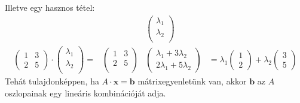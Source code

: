 \documentclass[a4paper,12pt,twoside]{book}
\newcommand{\vek}[1]{\mathbf{#1}} %
\theoremstyle{break}
\begin{document}
Illetve egy hasznos tétel:
\[\begin{matrix}
   & & \begin{pmatrix}
      \lambda_1 \\
      \lambda_2 \\
     \end{pmatrix} & \\

   \begin{pmatrix}
    1 & 3 \\
    2 & 5
   \end{pmatrix}\cdot \begin{pmatrix}
      \lambda_1 \\
      \lambda_2 \\
     \end{pmatrix} = 
   &
   \begin{pmatrix}
    1 & 3 \\
    2 & 5 \\
   \end{pmatrix}
   &
   \begin{pmatrix}
      \lambda_1 + 3\lambda_2\\
      2\lambda_1 + 5\lambda_2
     \end{pmatrix}
   & = \lambda_1\begin{pmatrix}1\\ 2\end{pmatrix} + \lambda_2\begin{pmatrix}3\\ 5\end{pmatrix}
  \end{matrix}
\]
Tehát tulajdonképpen, ha $A\cdot \vek{x} = \vek{b}$ mátrixegyenletünk van, akkor $\vek{b}$ az $A$ oszlopainak egy lineáris kombinációját adja.
\end{document}
